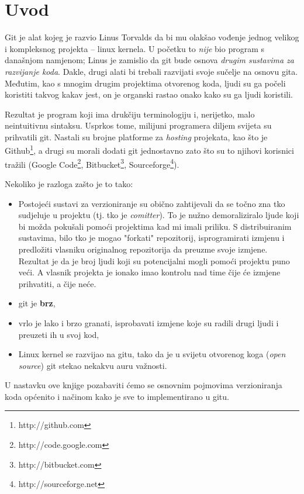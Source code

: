 \chapter*{Uvod}

Git je alat kojeg je razvio Linus Torvalds da bi mu olakšao vođenje jednog velikog i kompleksnog projekta -- linux kernela.
U početku to \emph{nije} bio program s današnjom namjenom; Linus je zamislio da git bude osnova \emph{drugim sustavima za razvijanje koda}.
Dakle, drugi alati bi trebali razvijati svoje sučelje na osnovu gita.
Međutim, kao s mnogim drugim projektima otvorenog koda, ljudi su ga počeli koristiti takvog kakav jest, on je organski rastao onako kako su ga ljudi koristili.

Rezultat je program koji ima drukčiju terminologiju i, nerijetko, malo neintuitivnu sintaksu. Usprkos tome, milijuni programera diljem svijeta su prihvatili git. 
Nastali su brojne platforme za \emph{hosting} projekata, kao što je Github\footnote{http://github.com}, a drugi su morali dodati git jednostavno zato što su to njihovi korisnici tražili (Google Code\footnote{http://code.google.com}, Bitbucket\footnote{http://bitbucket.com}, Sourceforge\footnote{http://sourceforge.net}).

Nekoliko je razloga zašto je to tako:

\begin{itemize}
	\item Postojeći sustavi za verzioniranje su obično zahtijevali da se točno zna tko sudjeluje u projektu (tj. tko je \emph{comitter}). To je nužno demoraliziralo ljude koji bi možda pokušali pomoći projektima kad mi imali priliku. S distribuiranim sustavima, bilo tko je mogao "forkati" repozitorij, isprogramirati izmjenu i predložiti vlasniku originalnog repozitorija da preuzme svoje izmjene. Rezultat je da je broj ljudi koji su potencijalni mogli pomoći projektu puno veći. A vlasnik projekta je ionako imao kontrolu nad time čije će izmjene prihvatiti, a čije neće.
	\item git je \textbf{brz},
	\item vrlo je lako i brzo granati, isprobavati izmjene koje su radili drugi ljudi i preuzeti ih u svoj kod,
	\item Linux kernel se razvijao na gitu, tako da je u svijetu otvorenog koga (\emph{open source}) git stekao nekakvu auru važnosti.
\end{itemize}

U nastavku ove knjige pozabaviti ćemo se osnovnim pojmovima verzioniranja koda općenito i načinom kako je sve to implementirano u gitu.

